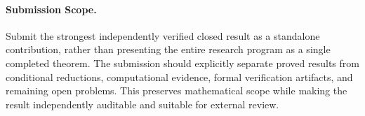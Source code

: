 \paragraph{Submission Scope.}

Submit the strongest independently verified closed result as a standalone contribution, rather than presenting the entire research program as a single completed theorem. The submission should explicitly separate proved results from conditional reductions, computational evidence, formal verification artifacts, and remaining open problems. This preserves mathematical scope while making the result independently auditable and suitable for external review.
